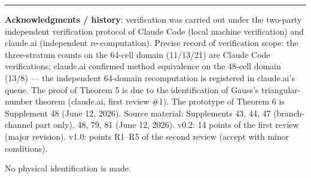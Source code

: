 \documentclass[
]{article}
\begin{document}
\begin{center}\rule{0.5\linewidth}{0.5pt}\end{center}

\textbf{Acknowledgments / history}: verification was carried out under
the two-party independent verification protocol of Claude Code (local
machine verification) and claude.ai (independent re-computation).
Precise record of verification scope: the three-stratum counts on the
64-cell domain (11/13/21) are Claude Code verifications; claude.ai
confirmed method equivalence on the 48-cell domain (13/8) --- the
independent 64-domain recomputation is registered in claude.ai's queue.
The proof of Theorem 5 is due to the identification of Gauss's
triangular-number theorem (claude.ai, first review \#1). The prototype
of Theorem 6 is Supplement 48 (June 12, 2026). Source material:
Supplements 43, 44, 47 (branch-channel part only), 48, 79, 81 (June 12,
2026). v0.2: 14 points of the first review (major revision). v1.0:
points R1--R5 of the second review (accept with minor conditions).

No physical identification is made.
\end{document}
